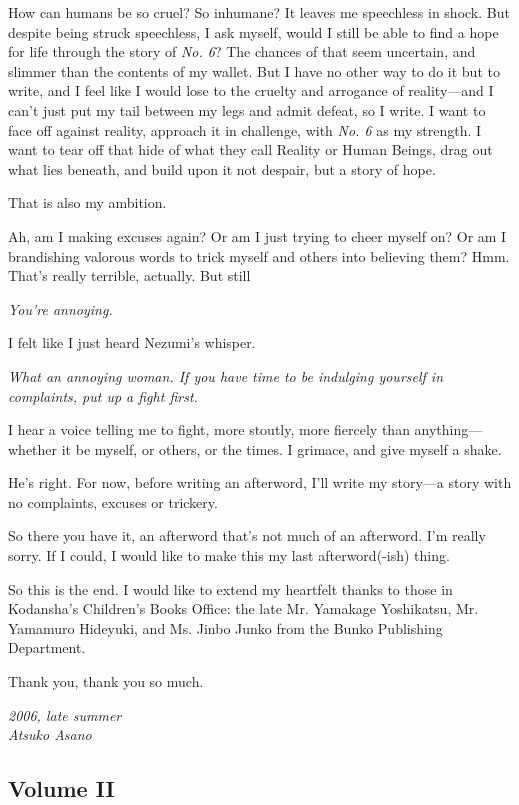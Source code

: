 How can humans be so cruel? So inhumane? It leaves me speechless in
shock. But despite being struck speechless, I ask myself, would I still
be able to find a hope for life through the story of \emph{No. 6}? The chances
of that seem uncertain, and slimmer than the contents of my wallet. But
I have no other way to do it but to write, and I feel like I would lose
to the cruelty and arrogance of reality---and I can't just put my tail
between my legs and admit defeat, so I write. I want to face off against
reality, approach it in challenge, with \emph{No. 6} as my strength. I want to
tear off that hide of what they call Reality or Human Beings, drag out
what lies beneath, and build upon it not despair, but a story of hope.

That is also my ambition.

Ah, am I making excuses again? Or am I just trying to cheer myself on?
Or am I brandishing valorous words to trick myself and others into
believing them? Hmm. That's really terrible, actually. But still\el 

\emph{You're annoying.}

I felt like I just heard Nezumi's whisper.

\emph{What an annoying woman. If you have time to be indulging yourself
in complaints, put up a fight first.}

I hear a voice telling me to fight, more stoutly, more fiercely than
anything---whether it be myself, or others, or the times. I grimace, and
give myself a shake.

He's right. For now, before writing an afterword, I'll write my story---a
story with no complaints, excuses or trickery.

So there you have it, an afterword that's not much of an afterword. I'm
really sorry. If I could, I would like to make this my last
afterword(-ish) thing.

So this is the end. I would like to extend my heartfelt thanks to those
in Kodansha's Children's Books Office: the late Mr. Yamakage Yoshikatsu,
Mr. Yamamuro Hideyuki, and Ms. Jinbo Junko from the Bunko Publishing
Department.

Thank you, thank you so much.

\myspace

\emph{2006, late summer\\
Atsuko Asano}

\subsection{Volume II}
